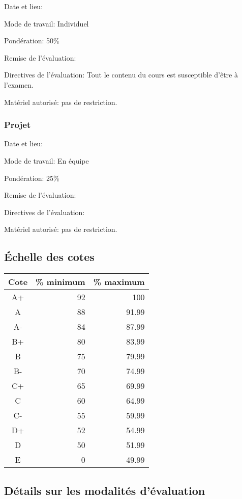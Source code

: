 \documentclass[
  french,
  letterpaper,
  DIV=11,
  numbers=noendperiod]{scrartcl}
\begin{document}
Date et lieu:

Mode de travail: Individuel

Pondération: 50\%

Remise de l'évaluation:

Directives de l'évaluation: Tout le contenu du cours est susceptible
d'être à l'examen.

Matériel autorisé: pas de restriction.

\subsubsection{Projet}\label{projet}

Date et lieu:

Mode de travail: En équipe

Pondération: 25\%

Remise de l'évaluation:

Directives de l'évaluation:

Matériel autorisé: pas de restriction.

\subsection{Échelle des cotes}\label{uxe9chelle-des-cotes}

\begin{longtable}[]{@{}crr@{}}
\toprule\noalign{}
Cote & \% minimum & \% maximum \\
\midrule\noalign{}
\endhead
\bottomrule\noalign{}
\endlastfoot
A+ & 92 & 100 \\
A & 88 & 91.99 \\
A- & 84 & 87.99 \\
B+ & 80 & 83.99 \\
B & 75 & 79.99 \\
B- & 70 & 74.99 \\
C+ & 65 & 69.99 \\
C & 60 & 64.99 \\
C- & 55 & 59.99 \\
D+ & 52 & 54.99 \\
D & 50 & 51.99 \\
E & 0 & 49.99 \\
\end{longtable}

\subsection{Détails sur les modalités
d'évaluation}\label{duxe9tails-sur-les-modalituxe9s-duxe9valuation}
\end{document}
